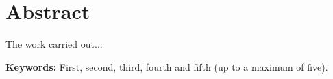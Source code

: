 \chapter*{Abstract}
\label{cha:abstract}


The work carried out...

\textbf{Keywords:} First, second, third, fourth and fifth (up to a
maximum of five).
